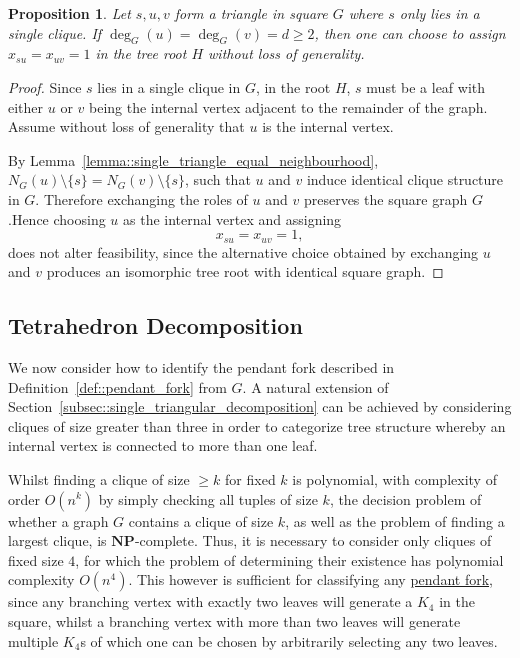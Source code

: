\documentclass[11pt]{article}
\newtheorem{proposition}{Proposition}
\begin{document}
\begin{proposition} \label{prop::single_triangular_decomposition_equality}
  Let $s,u,v$ form a triangle in square $G$ where $s$ only lies in a single clique. If $\deg_G(u)=\deg_G(v)=d\geq2$, then one can choose to assign $x_{su}=x_{uv}=1$ in the tree root $H$ without loss of generality.
\end{proposition}
\begin{proof}
  Since $s$ lies in a single clique in $G$, in the root $H$, $s$ must be a leaf with either $u$ or $v$ being the internal vertex adjacent to the remainder of the graph. Assume without loss of generality that $u$ is the internal vertex.

  By Lemma~\ref{lemma::single_triangle_equal_neighbourhood}, $N_G(u)\setminus\{s\}=N_G(v)\setminus\{s\}$, such that $u$ and $v$ induce identical clique structure in $G$. Therefore exchanging the roles of $u$ and $v$ preserves the square graph $G$.Hence choosing $u$ as the internal vertex and assigning
  \[
  x_{su}=x_{uv}=1,
  \]
  does not alter feasibility, since the alternative choice obtained by exchanging $u$ and $v$ produces an isomorphic tree root with identical square graph.
\end{proof}

\subsection{Tetrahedron Decomposition} \label{subsec::tetrahedron_decomposition}
We now consider how to identify the pendant fork described in Definition~\ref{def::pendant_fork} from $G$. A natural extension of Section~\ref{subsec::single_triangular_decomposition} can be achieved by considering cliques of size greater than three in order to categorize tree structure whereby an internal vertex is connected to more than one leaf. 

Whilst finding a clique of size $\geq k$ for fixed $k$ is polynomial, with complexity of order $O(n^k)$ by simply checking all tuples of size $k$, the decision problem of whether a graph $G$ contains a clique of size $k$, as well as the problem of finding a largest clique, is $\mathbf{NP}$-complete. Thus, it is necessary to consider only cliques of fixed size $4$, for which the problem of determining their existence has polynomial complexity $O(n^4)$. This however is sufficient for classifying any \hyperref[def::pendant_fork]{pendant fork}, since any branching vertex with exactly two leaves will generate a $K_4$ in the square, whilst a branching vertex with more than two leaves will generate multiple $K_4$s of which one can be chosen by arbitrarily selecting any two leaves.
\end{document}
